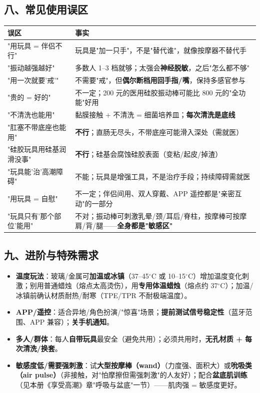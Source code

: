 \documentclass[12pt,UTF8,openany]{ctexbook}
\begin{document}
\subsection*{八、常见使用误区}
\begin{tabularx}{\textwidth}{X X}
\toprule
\textbf{误区} & \textbf{事实} \\
\midrule
"用玩具 = 伴侣不行" & 玩具是"加一只手"，不是"替代谁"，就像按摩器不替代手 \\
"振动越强越好" & 多数人 1--3 档就够；太强会\textbf{神经脱敏}，之后"怎么都不够" \\
"用一次就要'戒'" & 不需要"戒"，但\textbf{偶尔断档用回手指/嘴}，保持多感官参与 \\
"贵的 = 好的" & 不一定；200 元的医用硅胶振动棒可能比 800 元的"全功能"好用 \\
"不清洗也能用" & 黏膜接触 + 不清洗 = 细菌培养皿；\textbf{每次清洗是底线} \\
"肛塞不带底座也能用" & \textbf{不行}；直肠无尽头，不带底座可能滑入深处（需就医） \\
"硅胶玩具用硅基润滑没事" & \textbf{不行}；硅基会腐蚀硅胶表面（变粘/起皮/掉渣） \\
"玩具能'治'高潮障碍" & 不能；玩具是增强工具，不是治疗手段；持续障碍需就医 \\
"用玩具 = 自慰" & 不一定；伴侣间用、双人穿戴、APP 遥控都是"亲密互动"的一部分 \\
"玩具只有'那个部位'能用" & 不对；振动棒可刺激乳晕/颈/耳后/脊柱，按摩棒可按摩肩/背/腿——\textbf{全身都是"敏感区"} \\
\bottomrule
\end{tabularx}

\subsection*{九、进阶与特殊需求}
\begin{itemize}[leftmargin=2em,itemsep=0.4em]
  \item \textbf{温度玩法}：玻璃/金属可\textbf{加温或冰镇}（37--45$^\circ$C 或 10--15$^\circ$C）增加温度变化刺激；别用普通蜡烛（熔点太高烫伤），用\textbf{专用体温蜡烛}（熔点约 37$^\circ$C）；加温/冰镇前确认材质耐热/耐寒（TPE/TPR 不耐极端温度）。
  \item \textbf{APP/遥控}：适合异地/角色扮演/"惊喜"场景；\textbf{提前测试信号稳定性}（蓝牙范围、APP 兼容）；\textbf{关手机通知}。
  \item \textbf{多人/群体}：每人\textbf{自带玩具}最安全（避免共用）；必须共用时，\textbf{无孔材质 + 每次清洗/换套}。
  \item \textbf{敏感度低/需要强刺激}：试\textbf{大型按摩棒（wand）}（力度强、面积大）或\textbf{吮吸类（air pulse）}（非接触，对"怕摩擦但需强刺激"的人友好）；配合\textbf{盆底肌训练}（见本册《享受高潮》章"呼吸与盆底"一节）——肌肉强 = 敏感度更好。
\end{itemize}
\end{document}
